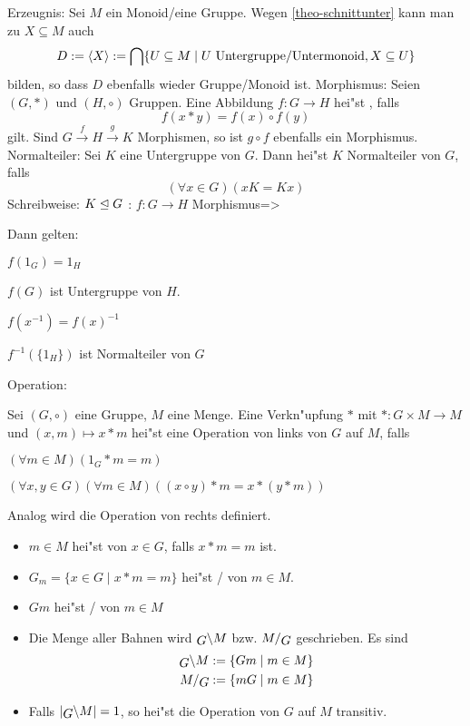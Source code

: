  Erzeugnis:{
  Sei $M$ ein Monoid/eine Gruppe. Wegen \ref{theo-schnittunter} kann man 
  zu $X\subseteq M$ auch 
  \[D:={\left\langle X\right\rangle}:=\bigcap\{ U\subseteq M\mid U \text{ Untergruppe/Untermonoid}, 
      X\subseteq U\}
    \]
  bilden, so dass $D$ ebenfalls wieder Gruppe/Monoid ist.
  }
 Morphismus:{
  Seien $(G,*)$ und $(H,\circ)$ Gruppen. Eine Abbildung $f:G\to H$ hei"st
  , falls
  \[f(x*y)=f(x)\circ f(y)
    \]
  gilt. Sind $G\xrightarrow{f}H\xrightarrow{g}K$ Morphismen, so ist $g\circ f$
  ebenfalls ein Morphismus.
  }
 Normalteiler:{
  Sei $K$ eine Untergruppe von $G$. Dann hei"st $K$ Normalteiler von $G$, falls
  \[(\forall x\in G)(xK=Kx)
    \]
  Schreibweise: $K\trianglelefteq G$
  }
\theorem: $f:G\to H$ Morphismus=>{
  Dann gelten:
  \begin{stmts}
    \item $f(1_G)=1_H$
    \item $f(G)$ ist Untergruppe von $H$.
    \item $f(x^{-1})=f(x)^{-1}$
    \item $f^{-1}(\{1_H\})$ ist Normalteiler von $G$
  \end{stmts}
  }
 Operation:{
  \label{def-operation}
  Sei $(G,\circ)$ eine Gruppe, $M$ eine Menge. Eine Verkn"upfung $*$ mit
  $*:G\times M\to M$ und $(x,m)\mapsto x*m$ hei"st eine Operation von links
  von $G$ auf $M$, falls
  \begin{stmts}
    \item $(\forall m\in M)(1_G*m=m)$
    \item $(\forall x,y\in G)(\forall m\in M)((x \circ y)*m = x*(y*m))$
  \end{stmts}
  Analog wird die Operation von rechts definiert. 
  \begin{itemize}
    \item $m\in M$ hei"st  von $x\in G$, falls $x*m=m$ ist.
    \item $G_m=\{x\in G\mid x*m=m\}$ hei"st 
      / von $m\in M$.      
    \item $Gm$ hei"st / von
      $m\in M$
    \item Die Menge aller Bahnen wird $\lcoset M G$ bzw. $\rcoset M G$ 
      geschrieben. Es sind
      \begin{align*}
        \lcoset M G&:=\{Gm\mid m\in M\} \\
        \rcoset M G&:=\{mG\mid m\in M\}
        \end{align*}
    \item Falls $|\lcoset M G|=1$, so hei"st die Operation von $G$ auf $M$
      transitiv.
  \end{itemize}
  }
